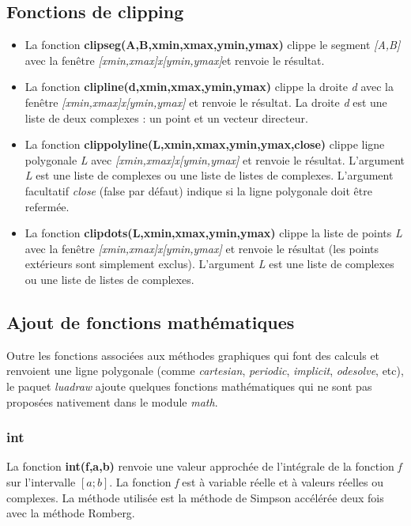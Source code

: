 \subsection{Fonctions de clipping}

\begin{itemize}
    \item La fonction \textbf{clipseg(A,B,xmin,xmax,ymin,ymax)} clippe le segment \emph{{[}A,B{]}} avec la fenêtre \emph{{[}xmin,xmax{]}x{[}ymin,ymax{]}}et renvoie le résultat.
    \item La fonction \textbf{clipline(d,xmin,xmax,ymin,ymax)} clippe la droite \emph{d} avec la fenêtre \emph{{[}xmin,xmax{]}x{[}ymin,ymax{]}} et renvoie le résultat. La droite \emph{d} est une liste de deux complexes : un point et un vecteur directeur.
    \item La fonction \textbf{clippolyline(L,xmin,xmax,ymin,ymax,close)} clippe ligne polygonale \emph{L} avec \emph{{[}xmin,xmax{]}x{[}ymin,ymax{]}} et renvoie le résultat. L'argument \emph{L} est une liste de complexes ou une liste de listes de complexes. L'argument facultatif \emph{close} (false par défaut) indique si la ligne polygonale doit être refermée.
    \item La fonction \textbf{clipdots(L,xmin,xmax,ymin,ymax)} clippe la liste de points \emph{L} avec la fenêtre \emph{{[}xmin,xmax{]}x{[}ymin,ymax{]}} et renvoie le résultat (les points extérieurs sont simplement exclus). L'argument \emph{L} est une liste de complexes ou une liste de listes de complexes.
\end{itemize}

\subsection{Ajout de fonctions mathématiques}
Outre les fonctions associées aux méthodes graphiques qui font des calculs et renvoient une ligne polygonale (comme \emph{cartesian}, \emph{periodic}, \emph{implicit}, \emph{odesolve}, etc), le paquet \emph{luadraw} ajoute quelques fonctions mathématiques qui ne sont pas proposées nativement dans le module \emph{math}.

\subsubsection{int}
La fonction \textbf{int(f,a,b)} renvoie une valeur approchée de l'intégrale de la fonction \emph{f} sur l'intervalle $[a;b]$. La fonction \emph{f} est à variable réelle et à valeurs réelles ou complexes. La méthode utilisée est la méthode de Simpson accélérée deux fois avec la méthode Romberg.


